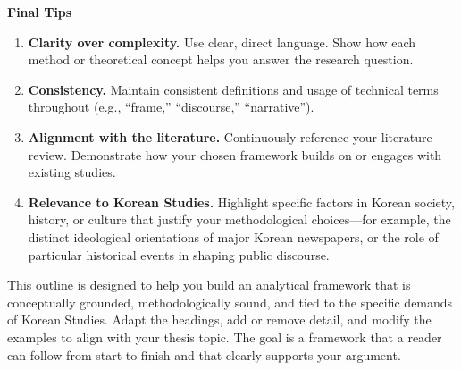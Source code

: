 \documentclass[11pt,a4paper]{article}
\begin{document}
\vspace{1em}
\begin{tipbox}
\textbf{Final Tips}
\begin{enumerate}[nosep, leftmargin=1.5em]
  \item \textbf{Clarity over complexity.} Use clear, direct language. Show how each method or theoretical concept helps you answer the research question.
  \item \textbf{Consistency.} Maintain consistent definitions and usage of technical terms throughout (e.g., ``frame,'' ``discourse,'' ``narrative'').
  \item \textbf{Alignment with the literature.} Continuously reference your literature review. Demonstrate how your chosen framework builds on or engages with existing studies.
  \item \textbf{Relevance to Korean Studies.} Highlight specific factors in Korean society, history, or culture that justify your methodological choices---for example, the distinct ideological orientations of major Korean newspapers, or the role of particular historical events in shaping public discourse.
\end{enumerate}
\end{tipbox}

\vspace{1em}

\noindent
This outline is designed to help you build an analytical framework that is conceptually grounded, methodologically sound, and tied to the specific demands of Korean Studies. Adapt the headings, add or remove detail, and modify the examples to align with your thesis topic. The goal is a framework that a reader can follow from start to finish and that clearly supports your argument.
\end{document}
